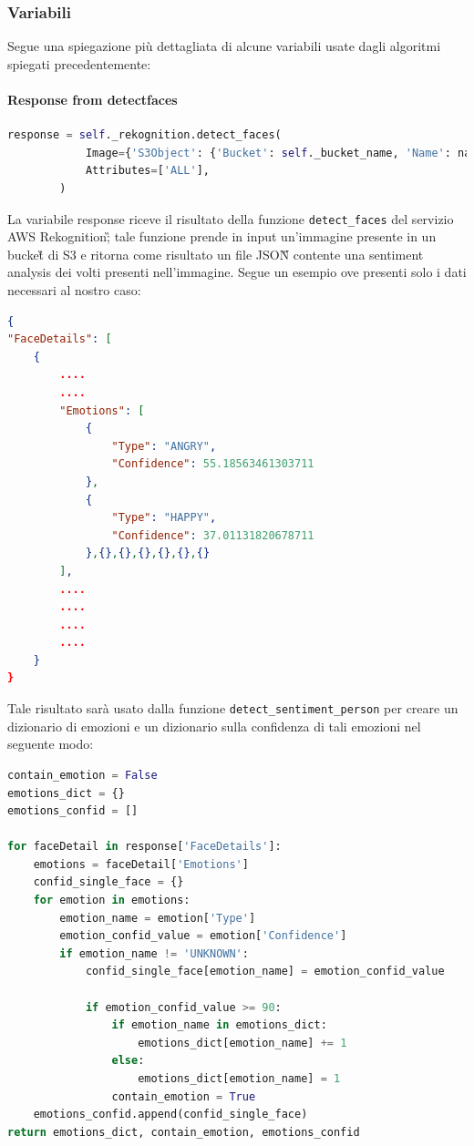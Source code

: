 \subsubsection{Variabili}
Segue una spiegazione più dettagliata di alcune variabili usate dagli algoritmi spiegati precedentemente:
\paragraph{Response from detect\textunderscore{}faces} \aCapo{}
\begin{lstlisting}[language=Python]
response = self._rekognition.detect_faces(
            Image={'S3Object': {'Bucket': self._bucket_name, 'Name': name_image}},
            Attributes=['ALL'],
        )
\end{lstlisting}
La variabile response riceve il risultato della funzione \verb+detect_faces+ del servizio AWS Rekognition\G; tale funzione prende in input un'immagine presente in un bucket\G{} di S3 e ritorna come risultato un file JSON\G{} contente  una sentiment analysis dei volti presenti nell'immagine. Segue un esempio ove presenti solo i dati necessari al nostro caso:
\begin{lstlisting}[language=JSON]
{
"FaceDetails": [
    {
    	....
    	....
        "Emotions": [
            {
                "Type": "ANGRY",
                "Confidence": 55.18563461303711
            },
            {
                "Type": "HAPPY",
                "Confidence": 37.01131820678711
            },{},{},{},{},{},{}
        ],
        ....
        ....
        ....
        ....
    }
}
\end{lstlisting}
Tale risultato sarà usato dalla funzione \verb+detect_sentiment_person+ per creare  un dizionario di emozioni e
un dizionario sulla confidenza di tali emozioni nel seguente modo:
\begin{lstlisting}[language=Python]
contain_emotion = False
emotions_dict = {}
emotions_confid = []

for faceDetail in response['FaceDetails']:
    emotions = faceDetail['Emotions']
    confid_single_face = {}
    for emotion in emotions:
        emotion_name = emotion['Type']
        emotion_confid_value = emotion['Confidence']
        if emotion_name != 'UNKNOWN':
            confid_single_face[emotion_name] = emotion_confid_value

            if emotion_confid_value >= 90:
                if emotion_name in emotions_dict:
                    emotions_dict[emotion_name] += 1
                else:
                    emotions_dict[emotion_name] = 1
                contain_emotion = True
    emotions_confid.append(confid_single_face)
return emotions_dict, contain_emotion, emotions_confid
\end{lstlisting}
